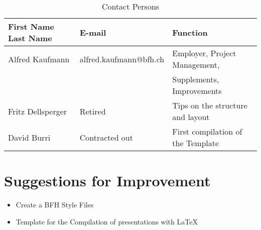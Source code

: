 \begin{table}[H]
	\centering
		\begin{tabular}{lll} \toprule
			\textbf{First Name Last Name} & \textbf{E-mail} & \textbf{Function} \\ \midrule
			Alfred Kaufmann & alfred.kaufmann@bfh.ch & Employer, Project Management, \\
			& & Supplements, Improvements \\ \midrule
			Fritz Dellsperger & Retired & Tips on the structure and layout \\ \midrule
			David Burri & Contracted out & First compilation of the Template \\ \bottomrule
		\end{tabular}
	\caption{Contact Persons}
	\label{tab:Contact Persons}
\end{table}


\section{Suggestions for Improvement}
\label{sec:introduction_suggestions}

\begin{itemize}
	\item Create a BFH Style Files
	\item Template for the Compilation of presentations with \LaTeX{}
\end{itemize}


